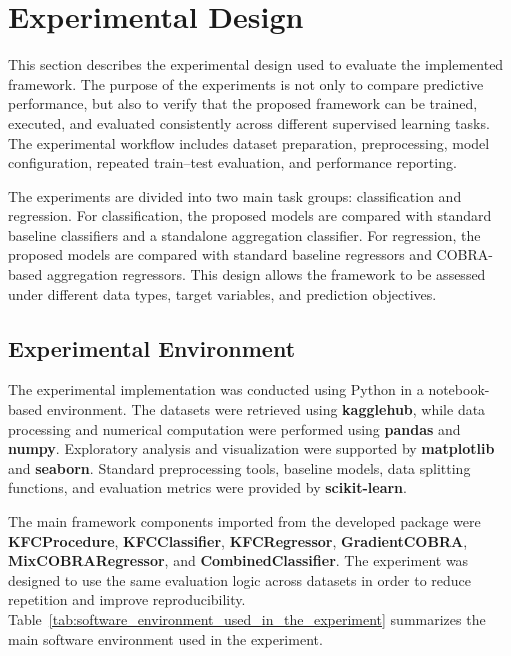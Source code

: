 
\section{Experimental Design}
\label{sec:experimental_design}

\hs This section describes the experimental design used to evaluate the implemented \KFCProcedure{} framework. The purpose of the experiments is not only to compare predictive performance, but also to verify that the proposed framework can be trained, executed, and evaluated consistently across different supervised learning tasks. The experimental workflow includes dataset preparation, preprocessing, model configuration, repeated train--test evaluation, and performance reporting.

The experiments are divided into two main task groups: classification and regression. For classification, the proposed models are compared with standard baseline classifiers and a standalone aggregation classifier. For regression, the proposed models are compared with standard baseline regressors and COBRA-based aggregation regressors. This design allows the framework to be assessed under different data types, target variables, and prediction objectives.

\subsection{Experimental Environment}

\hs The experimental implementation was conducted using Python in a notebook-based environment. The datasets were retrieved using \textbf{kagglehub}, while data processing and numerical computation were performed using \textbf{pandas} and \textbf{numpy}. Exploratory analysis and visualization were supported by \textbf{matplotlib} and \textbf{seaborn}. Standard preprocessing tools, baseline models, data splitting functions, and evaluation metrics were provided by \textbf{scikit-learn}.

The main framework components imported from the developed package were \textbf{KFCProcedure}, \textbf{KFCClassifier}, \textbf{KFCRegressor}, \textbf{GradientCOBRA}, \textbf{MixCOBRARegressor}, and \textbf{CombinedClassifier}. The experiment was designed to use the same evaluation logic across datasets in order to reduce repetition and improve reproducibility. Table~\ref{tab:software_environment_used_in_the_experiment} summarizes the main software environment used in the experiment.

